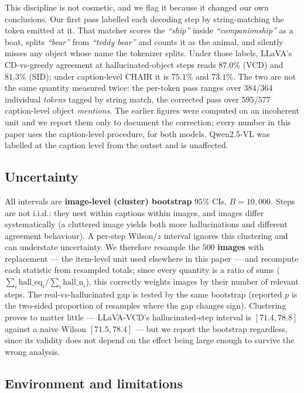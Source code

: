 This discipline is not cosmetic, and we flag it because it changed our own
conclusions. Our first pass labelled each decoding step by string-matching the
token emitted at it. That matcher scores the \emph{``ship''} inside
\emph{``companionship''} as a boat, splits \emph{``bear''} from \emph{``teddy
bear''} and counts it as the animal, and silently misses any object whose name
the tokenizer splits. Under those labels, LLaVA's CD-vs-greedy agreement at
hallucinated-object steps reads $87.0\%$ (VCD) and $81.3\%$ (SID); under
caption-level CHAIR it is $75.1\%$ and $73.1\%$. The two are not the same
quantity measured twice: the per-token pass ranges over $384$/$364$ individual
\emph{tokens} tagged by string match, the corrected pass over $595$/$577$
caption-level object \emph{mentions}. The earlier figures were computed on an
incoherent unit and we report them only to document the correction; every number
in this paper uses the caption-level procedure, for both models. Qwen2.5-VL was
labelled at the caption level from the outset and is unaffected.

\subsection{Uncertainty}
\label{subsec:cdmech-uncertainty}

All intervals are \textbf{image-level (cluster) bootstrap} $95\%$ CIs,
$B=10{,}000$. Steps are not i.i.d.: they nest within captions within images, and
images differ systematically (a cluttered image yields both more hallucinations
and different agreement behaviour). A per-step Wilson/$z$ interval ignores this
clustering and can understate uncertainty. We therefore resample the $500$
\textbf{images} with replacement --- the item-level unit used elsewhere in this
paper --- and recompute each statistic from resampled totals; since every
quantity is a ratio of sums ($\sum_i \text{hall\_eq}_i / \sum_i
\text{hall\_n}_i$), this correctly weights images by their number of relevant
steps. The real-vs-hallucinated gap is tested by the same bootstrap (reported
$p$ is the two-sided proportion of resamples where the gap changes sign).
Clustering proves to matter little --- LLaVA-VCD's hallucinated-step interval is
$[71.4, 78.8]$ against a naive Wilson $[71.5, 78.4]$ --- but we report the
bootstrap regardless, since its validity does not depend on the effect being
large enough to survive the wrong analysis.

\subsection{Environment and limitations}
\label{subsec:cdmech-limits}

